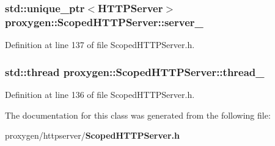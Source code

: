 \subsubsection[{server\+\_\+}]{\setlength{\rightskip}{0pt plus 5cm}std\+::unique\+\_\+ptr$<${\bf H\+T\+T\+P\+Server}$>$ proxygen\+::\+Scoped\+H\+T\+T\+P\+Server\+::server\+\_\+\hspace{0.3cm}{\ttfamily [private]}}\label{classproxygen_1_1ScopedHTTPServer_ad01730dadcc11482b211af4d52c54b5a}


Definition at line 137 of file Scoped\+H\+T\+T\+P\+Server.\+h.

\subsubsection[{thread\+\_\+}]{\setlength{\rightskip}{0pt plus 5cm}std\+::thread proxygen\+::\+Scoped\+H\+T\+T\+P\+Server\+::thread\+\_\+\hspace{0.3cm}{\ttfamily [private]}}\label{classproxygen_1_1ScopedHTTPServer_a0922054ed6d17413448270a88d3467d9}


Definition at line 136 of file Scoped\+H\+T\+T\+P\+Server.\+h.



The documentation for this class was generated from the following file\+:\begin{DoxyCompactItemize}
\item 
proxygen/httpserver/{\bf Scoped\+H\+T\+T\+P\+Server.\+h}\end{DoxyCompactItemize}
